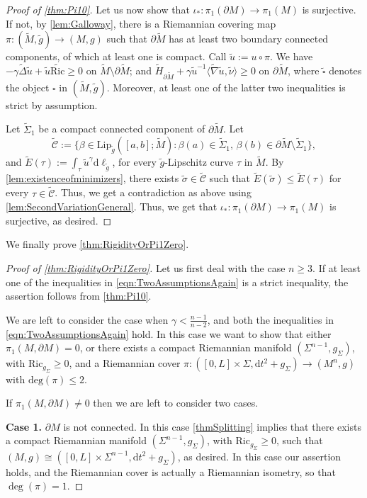 \documentclass[12pt,a4paper,reqno]{amsart}
\theoremstyle{definition}
\renewcommand{\leq}{\leqslant}
\renewcommand{\geq}{\geqslant}
\renewcommand{\tilde}{\widetilde}
\begin{document}
{\begin{proof}[Proof of \cref{thm:Pi10}]
    Let us now show that $\iota_*:\pi_1(\partial M)\to \pi_1(M)$ is surjective. If not, by \cref{lem:Galloway}, there is a Riemannian covering map $\pi:(\tilde M,\tilde g)\to (M,g)$ such that $\partial\tilde M$ has at least two boundary connected components, of which at least one is compact. Call $\tilde u:=u\circ \pi$. We have $-\gamma\tilde{\Delta}\tilde u+\tilde u\tilde{\mathrm{Ric}}\geq 0$ on $\tilde{M}\setminus\partial \tilde{M}$; and $\tilde{H}_{\partial\tilde M}+\gamma\tilde u^{-1}\langle\tilde\nabla\tilde u,\tilde\nu\rangle\geq 0$ on $\partial\tilde M$, where $\tilde{\square}$ denotes the object $\square$ in $(\tilde M,\tilde g)$. Moreover, at least one of the latter two inequalities is strict by assumption.  
    
    Let $\tilde\Sigma_1$ be a compact connected component of $\partial\tilde{M}$. Let 
    \[
\tilde{\mathcal{C}}:=\Big\{\beta\in \mathrm{Lip}_{\tilde g}([a,b];\tilde M):\beta(a)\in \tilde\Sigma_1,\, \beta(b) \in \partial \tilde M \setminus \tilde\Sigma_1\Big\},
\]
and $\tilde E(\tau):=\int_\tau \tilde u^\gamma \mathrm{d}\ell_{\tilde g}$, for every $\tilde g$-Lipschitz curve $\tau$ in $\tilde M$. By \cref{lem:existenceofminimizers}, 
there exists $\tilde\sigma\in\tilde{\mathcal{C}}$ such that $\tilde E(\tilde\sigma)\leq \tilde E(\tau)$ for every $\tau\in \tilde{\mathcal{C}}$. Thus, we get a contradiction as above using \cref{lem:SecondVariationGeneral}.
Thus, we get that $\iota_*:\pi_1(\partial M)\to \pi_1(M)$ is surjective, as desired.
\end{proof}

We finally prove \cref{thm:RigidityOrPi1Zero}.
\begin{proof}[Proof of \cref{thm:RigidityOrPi1Zero}]
    Let us first deal with the case $n\geq 3$. If at least one of the inequalities in \eqref{eqn:TwoAssumptionsAgain} is a strict inequality, the assertion follows from \cref{thm:Pi10}.

    We are left to consider the case when $\gamma<\frac{n-1}{n-2}$, and both the inequalities in \eqref{eqn:TwoAssumptionsAgain} hold. In this case we want to show that either $\pi_1(M,\partial M)=0$, or there exists a compact Riemannian manifold $(\Sigma^{n-1},g_\Sigma)$, with $\mathrm{Ric}_{g_\Sigma}\geq 0$, and a Riemannian cover $\pi:([0,L]\times\Sigma,\mathrm{d}t^2+g_{\Sigma})\to (M^n,g)$ with $\mathrm{deg}(\pi)\leq 2$. 

    If $\pi_1(M,\partial M)\neq 0$ then we are left to consider two cases.

    \textbf{Case 1.} $\partial M$ is not connected. In this case \cref{thmSplitting} implies that there exists a compact Riemannian manifold $(\Sigma^{n-1},g_\Sigma)$, with $\mathrm{Ric}_{g_\Sigma}\geq 0$, such that $(M,g)\cong ([0,L]\times\Sigma^{n-1},\mathrm{d}t^2+g_\Sigma)$, as desired. In this case our assertion holds, and the Riemannian cover is actually a Riemannian isometry, so that $\deg(\pi)=1$.


\end{proof}}
\end{document}
